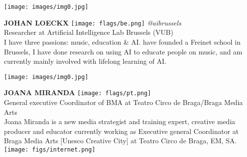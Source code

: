 \noindent
\begin{minipage}{0.3\textwidth}
\centering
\texttt{[image: images/img0.jpg]}
\end{minipage}
\hfill
\begin{minipage}{0.6\textwidth}\raggedright
\color{color1}\uppercase{\textbf{Johan Loeckx}}
\color{color2}\hspace{0.2cm}\texttt{[image: flags/be.png]}
\hspace{0.2cm}\textit{@aibrussels}
\\
Researcher at Artificial Intelligence Lab Brussels (VUB)\\
{\footnotesize I have three passions: music, education \& AI.  have founded a Freinet school in Brussels, I have done research on using AI to educate people on music, and am currently mainly involved with lifelong learning of AI.}\\
\end{minipage}
\newline\newline\newline

\noindent
\begin{minipage}{0.3\textwidth}
\centering
\texttt{[image: images/img0.jpg]}
\end{minipage}
\hfill
\begin{minipage}{0.6\textwidth}\raggedright
\color{color1}\uppercase{\textbf{Joana Miranda}}
\color{color2}\hspace{0.2cm}\texttt{[image: flags/pt.png]}
\\
General executive Coordinator of BMA at Teatro Circo de Braga/Braga Media Arts\\
{\footnotesize Joana Miranda is a new media strategist and training expert, creative media producer and educator currently working as Executive general Coordinator at Braga Media Arts [Unesco Creative City] at Teatro Circo de Braga, EM, SA.}\\
\texttt{[image: figs/internet.png]}
\end{minipage}
\newline\newline\newline

